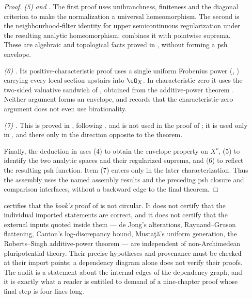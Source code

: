 \begin{proof}
\emph{(5)  and
.}  The first proof uses unibranchness,
finiteness and the diagonal criterion to make the normalization a universal
homeomorphism.  The second is the neighbourhood-filter identity for upper
semicontinuous regularization under the resulting analytic homeomorphism;
 combines it with pointwise suprema.  These are
algebraic and topological facts proved in
, without forming a psh envelope.

\emph{(6) .}  Its
positive-characteristic proof uses a single uniform Frobenius power
(,
) carrying every local section upstairs
into $\cO_X$.  In characteristic zero it uses the two-sided valuative sandwich
of , obtained from the additive-power
theorem .  Neither argument forms an envelope,
and  records that the characteristic-zero
argument does not even use birationality.

\emph{(7) .}  This is proved in , following
\cite[Theorem~5.12]{BJ22}, and is not used in the proof of
; it is used only in
, and there only in the
direction opposite to the theorem.

Finally, the deduction in  uses (4) to obtain the
envelope property on $X^\nu$, (5) to identify the two analytic spaces and
their regularized suprema, and (6) to reflect the resulting psh function.
Item (7) enters only in the later characterization.  Thus the assembly
uses the named assembly results and the preceding psh closure and
comparison interfaces, without a backward edge to the final theorem.
\end{proof}

\begin{remark}
\label{rem:ch45-audit-scope}
 certifies that the \emph{book's} proof of
 is not circular.  It does not certify that the
individual imported statements are correct, and it does not certify that the
external inputs quoted inside them --- de Jong's alterations, Raynaud--Gruson
flattening, Canton's log-discrepancy bound, Musta\c t\u a's uniform
generation, the Roberts--Singh additive-power theorem --- are independent of
non-Archimedean pluripotential theory.  Their precise hypotheses and provenance must be checked at their import
points; a dependency diagram alone does not verify their proofs.  The audit is a statement about the internal edges of the
dependency graph, and it is exactly what a reader is entitled to demand of a
nine-chapter proof whose final step is four lines long.
\end{remark}

